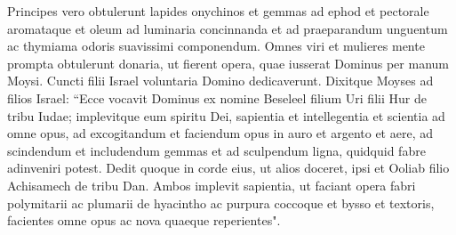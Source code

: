 \begin{biblechapter}
\verse Principes vero obtulerunt lapides onychinos et gemmas ad ephod et pectorale  
\verse aromataque et oleum ad luminaria concinnanda et ad praeparandum unguentum ac thymiama odoris suavissimi componendum. 
\verse Omnes viri et mulieres mente prompta obtulerunt donaria, ut fierent opera, quae iusserat Dominus per manum Moysi. Cuncti filii Israel voluntaria Domino dedicaverunt. 
\verse Dixitque Moyses ad filios Israel: “Ecce vocavit Dominus ex nomine Beseleel filium Uri filii Hur de tribu Iudae; 
\verse implevitque eum spiritu Dei, sapientia et intellegentia et scientia ad omne opus, 
\verse ad excogitandum et faciendum opus in auro et argento et aere, 
\verse ad scindendum et includendum gemmas et ad sculpendum ligna, quidquid fabre adinveniri potest. 
\verse Dedit quoque in corde eius, ut alios doceret, ipsi et Ooliab filio Achisamech de tribu Dan. 
\verse Ambos implevit sapientia, ut faciant opera fabri polymitarii ac plumarii de hyacintho ac purpura coccoque et bysso et textoris, facientes omne opus ac nova quaeque reperientes". 
\end{biblechapter}

